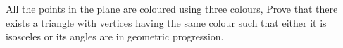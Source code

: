 \item All the points in the plane are coloured using three colours, Prove that there exists a triangle with vertices having the same colour such that either it is isosceles or its angles are in geometric progression.
 






